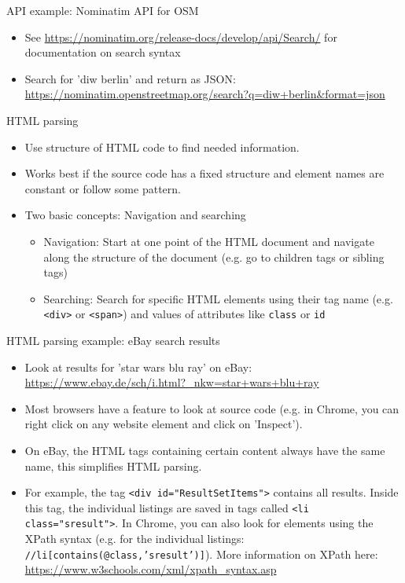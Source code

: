 \begin{frame}{API example: Nominatim API for OSM}
\begin{itemize}
	\item See \url{https://nominatim.org/release-docs/develop/api/Search/} for documentation on search syntax
	\item Search for 'diw berlin' and return as JSON: \url{https://nominatim.openstreetmap.org/search?q=diw+berlin&format=json}
\end{itemize}

\end{frame}

\begin{frame}{HTML parsing}
\begin{itemize}
	\item Use structure of HTML code to find needed information.
	\item Works best if the source code has a fixed structure and element names are constant or follow some pattern.
	\item Two basic concepts: Navigation and searching
	\begin{itemize}
		\item Navigation: Start at one point of the HTML document and navigate along the structure of the document (e.g. go to children tags or sibling tags)
		\item Searching: Search for specific HTML elements using their tag name (e.g. \texttt{<div>} or \texttt{<span>}) and values of attributes like \texttt{class} or \texttt{id}
	\end{itemize}
\end{itemize}
\end{frame}

\begin{frame}{HTML parsing example: eBay search results}
\begin{itemize}
	\item Look at results for 'star wars blu ray' on eBay: \url{https://www.ebay.de/sch/i.html?_nkw=star+wars+blu+ray}
	\item Most browsers have a feature to look at source code (e.g. in Chrome, you can right click on any website element and click on 'Inspect').
	\item On eBay, the HTML tags containing certain content always have the same name, this simplifies HTML parsing.
	\item For example, the tag \texttt{<div id="ResultSetItems">} contains all results. Inside this tag, the individual listings are saved in tags called \texttt{<li class="sresult">}. In Chrome, you can also look for elements using the XPath syntax (e.g. for the individual listings: \texttt{//li[contains(@class,'sresult')]}). More information on XPath here: \url{https://www.w3schools.com/xml/xpath_syntax.asp}
\end{itemize}
\end{frame}

